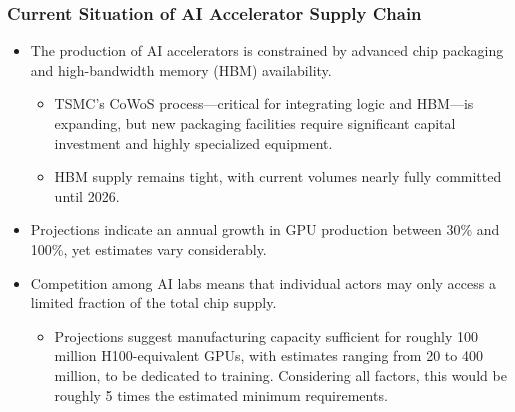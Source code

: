 \documentclass[aspectratio=169]{beamer}
\begin{document}
    \begin{frame}
        \frametitle{Current Situation of AI Accelerator Supply Chain}
        \begin{itemize}
            \item The production of AI accelerators is constrained by advanced chip packaging and high-bandwidth memory (HBM) availability.
            \begin{itemize}
                \item TSMC’s CoWoS process—critical for integrating logic and HBM—is expanding, but new packaging facilities require significant capital investment and highly specialized equipment.
                \item HBM supply remains tight, with current volumes nearly fully committed until 2026.
            \end{itemize}
            \item Projections indicate an annual growth in GPU production between 30\% and 100\%, yet estimates vary considerably.
            \item Competition among AI labs means that individual actors may only access a limited fraction of the total chip supply.
            \begin{itemize}
                \item Projections suggest manufacturing capacity sufficient for roughly 100 million H100-equivalent GPUs, with estimates ranging from 20 to 400 million, to be dedicated to training.
                Considering all factors, this would be \alert{roughly 5 times the estimated minimum requirements}.
            \end{itemize}
        \end{itemize}
    \end{frame}
    
\end{document}
